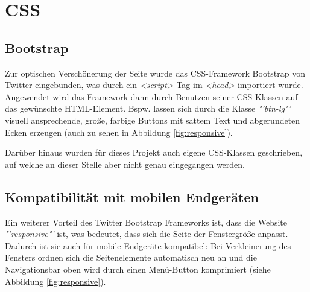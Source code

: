 \section{CSS}
\label{CSS}
\subsection{Bootstrap}
\label{Bootstrap}
Zur optischen Verschönerung der Seite wurde das CSS-Framework Bootstrap von Twitter eingebunden, was durch ein \textit{<script>}-Tag im \textit{<head>} importiert wurde. Angewendet wird das Framework dann durch Benutzen seiner CSS-Klassen auf das gewünschte HTML-Element. Bspw. lassen sich durch die Klasse \textit{"'btn-lg"'} visuell ansprechende, große, farbige Buttons mit sattem Text und abgerundeten Ecken erzeugen (auch zu sehen in Abbildung \vref{fig:responsive}).
\par
Darüber hinaus wurden für dieses Projekt auch eigene CSS-Klassen geschrieben, auf welche an dieser Stelle aber nicht genau eingegangen werden.

\subsection{Kompatibilität mit mobilen Endgeräten}
\label{Kompatibilität mit mobilen Endgeräten}
Ein weiterer Vorteil des Twitter Bootstrap Frameworks ist, dass die Website \textit{"'responsive"'} ist, was bedeutet, dass sich die Seite der Fenstergröße anpasst. Dadurch ist sie auch für mobile Endgeräte kompatibel: Bei Verkleinerung des Fensters ordnen sich die Seitenelemente automatisch neu an und die Navigationsbar oben wird durch einen Menü-Button komprimiert (siehe Abbildung \vref{fig:responsive}).

